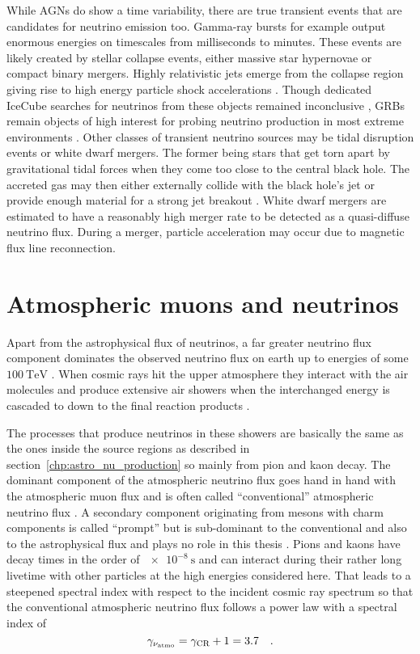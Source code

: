 While AGNs do show a time variability, there are true transient events that are candidates for neutrino emission too.
Gamma-ray bursts for example output enormous energies on timescales from milliseconds to minutes.
These events are likely created by stellar collapse events, either massive star hypernovae or compact binary mergers.
Highly relativistic jets emerge from the collapse region giving rise to high energy particle shock accelerations \cite{Bianco:2007fe}.
Though dedicated IceCube searches for neutrinos from these objects remained inconclusive \cite{Aartsen:2016qcr,Abbasi:2010grb}, GRBs remain objects of high interest for probing neutrino production in most extreme environments \cite{Senno:2016grb}.
Other classes of transient neutrino sources may be tidal disruption events or white dwarf mergers.
The former being stars that get torn apart by gravitational tidal forces when they come too close to the central black hole.
The accreted gas may then either externally collide with the black hole's jet or provide enough material for a strong jet breakout \cite{Mattila:2018gsg}.
White dwarf mergers are estimated to have a reasonably high merger rate to be detected as a quasi-diffuse neutrino flux.
During a merger, particle acceleration may occur due to magnetic flux line reconnection.


\section{Atmospheric muons and neutrinos}
Apart from the astrophysical flux of neutrinos, a far greater neutrino flux component dominates the observed neutrino flux on earth up to energies of some $\SI{100}{\TeV}$ \cite{Engberg:2008prompt,Gaisser:2002jj}.
When cosmic rays hit the upper atmosphere they interact with the air molecules and produce extensive air showers when the interchanged energy is cascaded to down to the final reaction products \cite{Gaisser:2016uoy}.

The processes that produce neutrinos in these showers are basically the same as the ones inside the source regions as described in section~\ref{chp:astro_nu_production} so mainly from pion and kaon decay.
The dominant component of the atmospheric neutrino flux goes hand in hand with the atmospheric muon flux and is often called \enquote{conventional} atmospheric neutrino flux \cite{Gaisser:2002jj,Gondolo:1995fq}.
A secondary component originating from mesons with charm components is called \enquote{prompt} but is sub-dominant to the conventional and also to the astrophysical flux and plays no role in this thesis \cite{Engberg:2008prompt,Haack:2017dxi}.
Pions and kaons have decay times in the order of $\SI{e-8}{\s}$ and can interact during their rather long livetime with other particles at the high energies considered here.
That leads to a steepened spectral index with respect to the incident cosmic ray spectrum so that the conventional atmospheric neutrino flux follows a power law with a spectral index of \cite{Gondolo:1995fq}
\begin{equation}
  \gamma_{\nu_\text{atmo}} = \gamma_\text{CR} + 1 = 3.7
  \quad\text{.}
\end{equation}